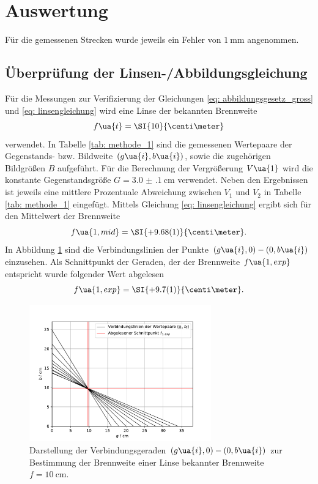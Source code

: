 \section{Auswertung}
Für die gemessenen Strecken wurde jeweils ein Fehler von $\SI{1}{\milli\meter}$ angenommen. %

\subsection{Überprüfung der Linsen-/Abbildungsgleichung}
Für die Messungen zur Verifizierung der Gleichungen \eqref{eq: abbildungsgesetz_gross} und \eqref{eq: linsengleichung} wird eine Linse
der bekannten Brennweite
\begin{equation}
  f\ua{t} = \SI{10}{\centi\meter}
\end{equation}
verwendet. In Tabelle \ref{tab: methode_1} sind die gemessenen Wertepaare der Gegenstands- bzw. Bildweite $(g\ua{i}, b\ua{i})$,
sowie die zugehörigen Bildgrößen $B$ aufgeführt. Für die Berechnung der Vergrößerung $V\ua{1}$
wird die konstante Gegenstandsgröße $G = \SI{3.0(1)}{\centi\meter}$ verwendet. Neben den Ergebnissen ist jeweils
eine mittlere Prozentuale Abweichung zwischen $V_1$ und $V_2$ in Tabelle \ref{tab: methode_1} eingefügt.
Mittels Gleichung \eqref{eq: linsengleichung} ergibt sich für den Mittelwert der Brennweite
\begin{equation}
  f\ua{1, mid} = \SI{+9.68(1)}{\centi\meter}.
\end{equation}
In Abbildung \ref{fig: methode_1} sind die Verbindungslinien der Punkte $(g\ua{i}, 0)-(0, b\ua{i})$ einzusehen. Als Schnittpunkt
der Geraden, der der Brennweite $f\ua{1, exp}$ entspricht wurde folgender Wert abgelesen
\begin{equation}
  f\ua{1, exp} = \SI{+9.7(1)}{\centi\meter}.
\end{equation}
\begin{figure}
  \centering
  \includegraphics[width=0.7\textwidth]{../Messdaten/plots/methode_1.pdf}
  \caption{Darstellung der Verbindungsgeraden $(g\ua{i}, 0) - (0, b\ua{i})$ zur Bestimmung der Brennweite einer
  Linse bekannter Brennweite $f = \SI{10}{\centi\meter}$.}
  \label{fig: methode_1}
\end{figure}


